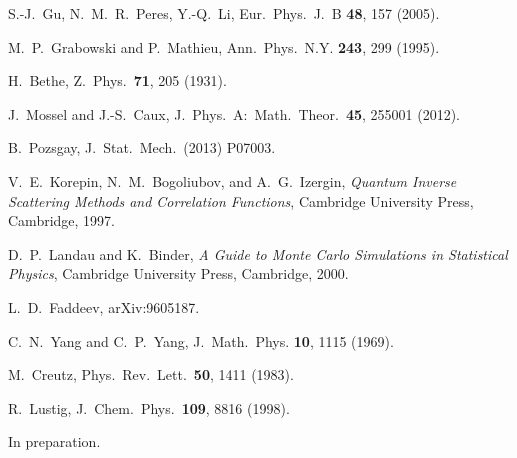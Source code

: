\documentclass[twocolumn,superscriptaddress,prb,10pt]{revtex4-1}
\begin{document}
\begin{thebibliography}{99}
S.-J.~Gu, N.~M.~R.~Peres, Y.-Q.~Li, Eur.\ Phys.\ J.\ B {\bf 48}, 157 (2005). 

M.~P.~Grabowski and P.~Mathieu, Ann.\ Phys.\ N.Y. {\bf 243}, 
299 (1995). 

H.~Bethe, Z.\ Phys.\ {\bf 71}, 205 (1931). 

J.~Mossel and J.-S.~Caux, J.\ Phys.\ A:\ Math.\ Theor.\ {\bf 45}, 
255001 (2012). 


B.~Pozsgay, J.\ Stat.\ Mech.\ (2013) P07003. 

V.~E.~Korepin, N.~M.~Bogoliubov, and A.~G.~Izergin, \emph{Quantum 
Inverse Scattering Methods and Correlation Functions}, Cambridge 
University Press, Cambridge, 1997. 

D.~P.~Landau and K.~Binder, \emph{A Guide to Monte Carlo Simulations in 
Statistical Physics}, Cambridge University Press, Cambridge, 2000.

L.~D.~Faddeev, arXiv:9605187.

C.~N.~Yang and C.~P.~Yang, J.\ Math.\ Phys. {\bf 10}, 1115 (1969).

M.~Creutz, Phys.\ Rev.\ Lett.\ {\bf 50}, 1411 (1983).

R.~Lustig, J.\ Chem.\ Phys.\ {\bf 109}, 8816 (1998).

In preparation. 



\end{thebibliography}
\end{document}
